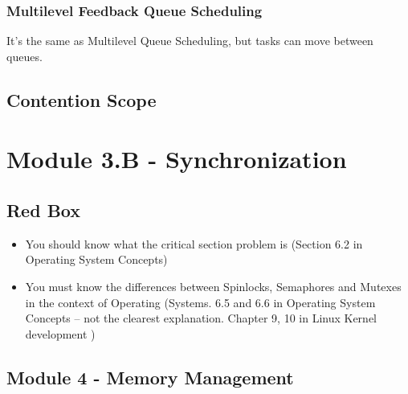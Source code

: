 \documentclass{article}
\begin{document}
\subsubsection{Multilevel Feedback Queue Scheduling}

It's the same as Multilevel Queue Scheduling, but tasks can move between queues. 


\subsection{Contention Scope} %


\subsection{}




\section{Module 3.B - Synchronization}
\subsection{Red Box}
\begin{itemize}
    \item You should know what the critical section problem is (Section 6.2 in Operating System Concepts)
    \item You must know the differences between Spinlocks, Semaphores and Mutexes in the context of Operating
    (Systems. 6.5 and 6.6 in Operating System Concepts – not the clearest explanation. Chapter 9, 10 in Linux Kernel
    development )
\end{itemize}


\subsection{Module 4 - Memory Management}
\end{document}
